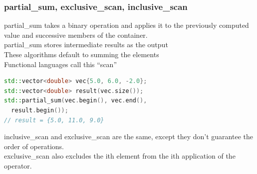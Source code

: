\documentclass{beamer}
\begin{document}
\begin{frame}[fragile]
  \frametitle{partial\_sum, exclusive\_scan, inclusive\_scan}
  partial\_sum takes a binary operation and applies it to the
  previously computed value and successive members of the container.\\
  partial\_sum stores intermediate results as the output\\
  These algorithms default to summing the elements\\
  Functional languages call this ``scan''\\

  \begin{lstlisting}[language=C++]
std::vector<double> vec{5.0, 6.0, -2.0};
std::vector<double> result(vec.size());
std::partial_sum(vec.begin(), vec.end(),
  result.begin());
// result = {5.0, 11.0, 9.0}
  \end{lstlisting}
  inclusive\_scan and exclusive\_scan are the same, except they don't guarantee the order of operations.\\
  exclusive\_scan also excludes the ith element from the ith application of the operator.
\end{frame}
\end{document}

